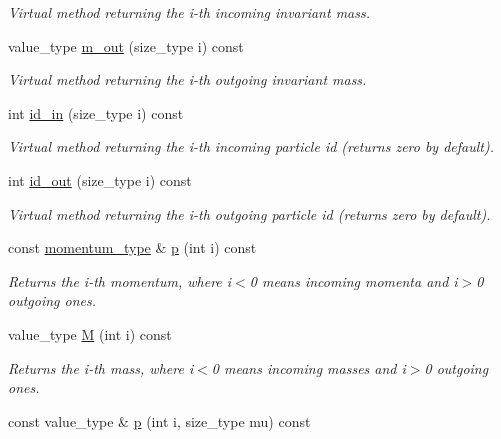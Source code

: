 \begin{DoxyCompactItemize}
\begin{DoxyCompactList}\small\item\em Virtual method returning the i-\/th incoming invariant mass. \end{DoxyCompactList}\item 
\hypertarget{a00544_a4d195f3f1c1f7ca1558167ccc0270f10}{}value\+\_\+type \hyperlink{a00544_a4d195f3f1c1f7ca1558167ccc0270f10}{m\+\_\+out} (size\+\_\+type i) const \label{a00544_a4d195f3f1c1f7ca1558167ccc0270f10}

\begin{DoxyCompactList}\small\item\em Virtual method returning the i-\/th outgoing invariant mass. \end{DoxyCompactList}\item 
int \hyperlink{a00544_a07fed7558892782e27d85ee4fe009c83}{id\+\_\+in} (size\+\_\+type i) const 
\begin{DoxyCompactList}\small\item\em Virtual method returning the i-\/th incoming particle id (returns zero by default). \end{DoxyCompactList}\item 
int \hyperlink{a00544_a9670babe6e6eb25f8d13102043e7da2f}{id\+\_\+out} (size\+\_\+type i) const 
\begin{DoxyCompactList}\small\item\em Virtual method returning the i-\/th outgoing particle id (returns zero by default). \end{DoxyCompactList}\item 
const \hyperlink{a00579}{momentum\+\_\+type} \& \hyperlink{a00544_a1448d1b1703d189b695bc5a574f3ffd0}{p} (int i) const 
\begin{DoxyCompactList}\small\item\em Returns the i-\/th momentum, where i$<$0 means incoming momenta and i$>$0 outgoing ones. \end{DoxyCompactList}\item 
value\+\_\+type \hyperlink{a00544_a758913b3b8feb0f048f815e468c2f2b8}{M} (int i) const 
\begin{DoxyCompactList}\small\item\em Returns the i-\/th mass, where i$<$0 means incoming masses and i$>$0 outgoing ones. \end{DoxyCompactList}\item 
\hypertarget{a00544_a13b9a1c17155b45fd90e69ef4e087ce1}{}const value\+\_\+type \& \hyperlink{a00544_a13b9a1c17155b45fd90e69ef4e087ce1}{p} (int i, size\+\_\+type mu) const \label{a00544_a13b9a1c17155b45fd90e69ef4e087ce1}


\end{DoxyCompactItemize}
